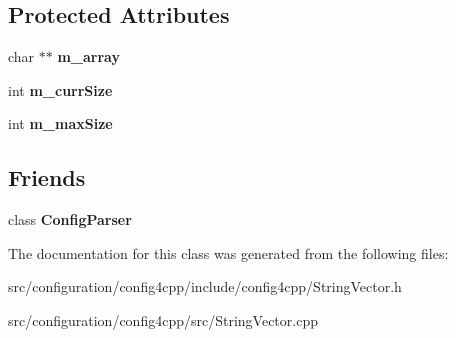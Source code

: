 \subsection*{Protected Attributes}
\begin{DoxyCompactItemize}
\item 
\hypertarget{classCONFIG4CPP__NAMESPACE_1_1StringVector_ac6c5e3bacd234be5d46a149bf5ae7a48}{char $\ast$$\ast$ {\bfseries m\-\_\-array}}\label{classCONFIG4CPP__NAMESPACE_1_1StringVector_ac6c5e3bacd234be5d46a149bf5ae7a48}

\item 
\hypertarget{classCONFIG4CPP__NAMESPACE_1_1StringVector_a12e23614153eebab80aedf23ccf5ccfc}{int {\bfseries m\-\_\-curr\-Size}}\label{classCONFIG4CPP__NAMESPACE_1_1StringVector_a12e23614153eebab80aedf23ccf5ccfc}

\item 
\hypertarget{classCONFIG4CPP__NAMESPACE_1_1StringVector_a29ee0c730870deafa73c7dcf8ca7dbe4}{int {\bfseries m\-\_\-max\-Size}}\label{classCONFIG4CPP__NAMESPACE_1_1StringVector_a29ee0c730870deafa73c7dcf8ca7dbe4}

\end{DoxyCompactItemize}
\subsection*{Friends}
\begin{DoxyCompactItemize}
\item 
\hypertarget{classCONFIG4CPP__NAMESPACE_1_1StringVector_a26bfbd623d9dac71aeaaa26ac67820b6}{class {\bfseries Config\-Parser}}\label{classCONFIG4CPP__NAMESPACE_1_1StringVector_a26bfbd623d9dac71aeaaa26ac67820b6}

\end{DoxyCompactItemize}


The documentation for this class was generated from the following files\-:\begin{DoxyCompactItemize}
\item 
src/configuration/config4cpp/include/config4cpp/String\-Vector.\-h\item 
src/configuration/config4cpp/src/String\-Vector.\-cpp\end{DoxyCompactItemize}
